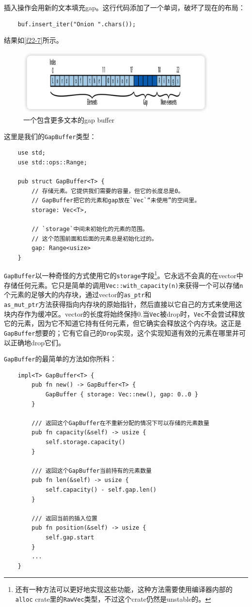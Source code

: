 插入操作会用新的文本填充gap。这行代码添加了一个单词，破坏了现在的布局：
\begin{verbatim}
    buf.insert_iter("Onion ".chars());
\end{verbatim}

结果如\autoref{f22-7}所示。

\begin{figure}[htbp]
    \centering
    \includegraphics[width=0.9\textwidth]{../img/f22-7.png}
    \caption{一个包含更多文本的gap buffer}
    \label{f22-7}
\end{figure}

这里是我们的\texttt{GapBuffer}类型：
\begin{verbatim}
    use std;
    use std::ops::Range;

    pub struct GapBuffer<T> {
        // 存储元素。它提供我们需要的容量，但它的长度总是0。
        // GapBuffer把它的元素和gap放在`Vec`“未使用”的空间里。
        storage: Vec<T>,

        // `storage`中间未初始化的元素的范围。
        // 这个范围前面和后面的元素总是初始化过的。
        gap: Range<usize>
    }
\end{verbatim}

\texttt{GapBuffer}以一种奇怪的方式使用它的\texttt{storage}字段\footnote{还有一种方法可以更好地实现这些功能，这种方法需要使用编译器内部的\texttt{alloc} crate里的\texttt{RawVec}类型，不过这个crate仍然是unstable的。}。它永远不会真的在vector中存储任何元素。它只是简单的调用\texttt{Vec::with\_capacity(n)}来获得一个可以存储\texttt{n}个元素的足够大的内存块，通过vector的\texttt{as\_ptr}和\\
\texttt{as\_mut\_ptr}方法获得指向内存块的原始指针，然后直接以它自己的方式来使用这块内存作为缓冲区。vector的长度将始终保持0.当\texttt{Vec}被drop时，\texttt{Vec}不会尝试释放它的元素，因为它不知道它持有任何元素，但它确实会释放这个内存块。这正是\texttt{GapBuffer}想要的；它有它自己的\texttt{Drop}实现，这个实现知道有效的元素在哪里并可以正确地drop它们。

\texttt{GapBuffer}的最简单的方法如你所料：
\begin{verbatim}
    impl<T> GapBuffer<T> {
        pub fn new() -> GapBuffer<T> {
            GapBuffer { storage: Vec::new(), gap: 0..0 }
        }

        /// 返回这个GapBuffer在不重新分配的情况下可以存储的元素数量
        pub fn capacity(&self) -> usize {
            self.storage.capacity()
        }

        /// 返回这个GapBuffer当前持有的元素数量
        pub fn len(&self) -> usize {
            self.capacity() - self.gap.len()
        }

        /// 返回当前的插入位置
        pub fn position(&self) -> usize {
            self.gap.start
        }
        ...
    }
\end{verbatim}

